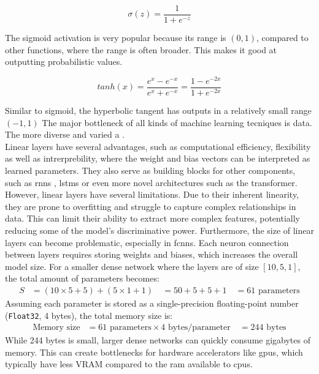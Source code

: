 \begin{equation}
    \sigma(z) = \frac{1} {1 + e^{-z}}
\end{equation}

The sigmoid activation is very popular because its range is $(0,1)$, compared to other functions, where the range is often broader. This makes it good at outputting probabilistic values.

\begin{equation}
    tanh(x) = \frac{e^x - e^{-x}}{e^x + e^{-x}} = \frac{1 - e^{-2x}}{1 + e^{-2x}}
\end{equation}

Similar to sigmoid, the hyperbolic tangent has outputs in a relatively small range $(-1, 1)$
The major bottleneck of all kinds of machine learning tecniques is data. The more diverse and varied a . \\

Linear layers have several advantages, such as computational efficiency, flexibility as well as intrerprebility, where the weight and bias vectors can be interpreted as learned parameters. They also serve as building blocks for other components, such as \acrshort{rnn}s \cite{schmidt2019recurrent}, \acrshort{lstm}s \cite{lstm} or even more novel architectures such as the transformer\cite{vaswani2017attention}. \\ 

However, linear layers have several limitations. Due to their inherent linearity, they are prone to overfitting and struggle to capture complex relationships in data. This can limit their ability to extract more complex features, potentially reducing some of the model's discriminative power. Furthermore, the size of linear layers can become problematic, especially in \acrshort{fcnn}s. Each neuron connection between layers requires storing weights and biases, which increases the overall model size. For a smaller dense network where the layers are of size $[10, 5, 1]$, the total amount of parameters becomes:
$$\begin{aligned}
S &= (10 \times 5 + 5) + (5 \times 1 + 1) \
&= 50 + 5 + 5 + 1 \
&= 61 \text{ parameters}
\end{aligned}$$
Assuming each parameter is stored as a single-precision floating-point number (\texttt{Float32}, 4 bytes), the total memory size is:
$$\begin{aligned}
\text{Memory size} &= 61 \text{ parameters} \times 4 \text{ bytes/parameter} \
&= 244 \text{ bytes}
\end{aligned}$$ While 244 bytes is small, larger dense networks can quickly consume gigabytes of memory. This can create bottlenecks for hardware accelerators like \acrshort{gpu}s, which typically have less VRAM compared to the \acrshort{ram} available to \acrshort{cpu}s.
